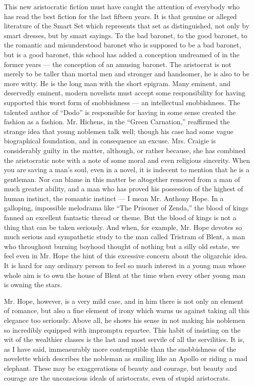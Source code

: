 This new aristocratic fiction must have caught the attention of everybody who has read the best fiction for the last fifteen years. It is that genuine or alleged literature of the Smart Set which represents that set as distinguished, not only by smart dresses, but by smart sayings. To the bad baronet, to the good baronet, to the romantic and misunderstood baronet who is supposed to be a bad baronet, but is a good baronet, this school has added a conception undreamed of in the former years — the conception of an amusing baronet. The aristocrat is not merely to be taller than mortal men and stronger and handsomer, he is also to be more witty. He is the long man with the short epigram. Many eminent, and deservedly eminent, modern novelists must accept some responsibility for having supported this worst form of snobbishness — an intellectual snobbishness. The talented author of “Dodo” is responsible for having in some sense created the fashion as a fashion. Mr. Hichens, in the “Green Carnation,” reaffirmed the strange idea that young noblemen talk well; though his case had some vague biographical foundation, and in consequence an excuse. Mrs. Craigie is considerably guilty in the matter, although, or rather because, she has combined the aristocratic note with a note of some moral and even religious sincerity. When you are saving a man’s soul, even in a novel, it is indecent to mention that he is a gentleman. Nor can blame in this matter be altogether removed from a man of much greater ability, and a man who has proved his possession of the highest of human instinct, the romantic instinct — I mean Mr. Anthony Hope. In a galloping, impossible melodrama like “The Prisoner of Zenda,” the blood of kings fanned an excellent fantastic thread or theme. But the blood of kings is not a thing that can be taken seriously. And when, for example, Mr. Hope devotes so much serious and sympathetic study to the man called Tristram of Blent, a man who throughout burning boyhood thought of nothing but a silly old estate, we feel even in Mr. Hope the hint of this excessive concern about the oligarchic idea. It is hard for any ordinary person to feel so much interest in a young man whose whole aim is to own the house of Blent at the time when every other young man is owning the stars.

Mr. Hope, however, is a very mild case, and in him there is not only an element of romance, but also a fine element of irony which warns us against taking all this elegance too seriously. Above all, he shows his sense in not making his noblemen so incredibly equipped with impromptu repartee. This habit of insisting on the wit of the wealthier classes is the last and most servile of all the servilities. It is, as I have said, immeasurably more contemptible than the snobbishness of the novelette which describes the nobleman as smiling like an Apollo or riding a mad elephant. These may be exaggerations of beauty and courage, but beauty and courage are the unconscious ideals of aristocrats, even of stupid aristocrats.

